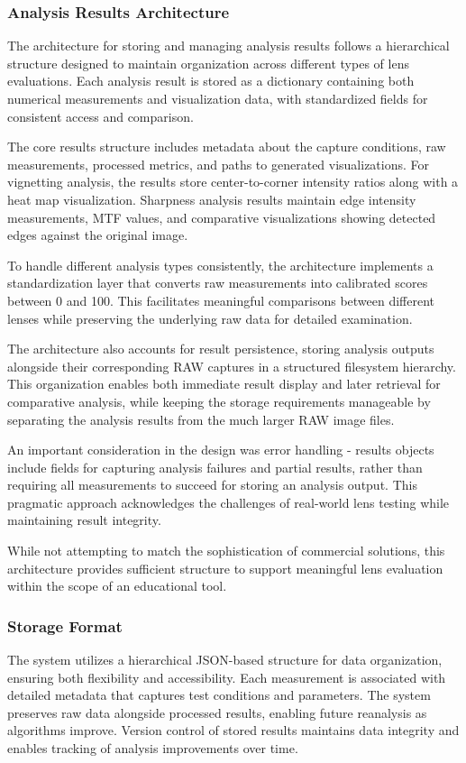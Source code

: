 \subsubsection{Analysis Results Architecture}
The architecture for storing and managing analysis results follows a hierarchical structure designed to maintain organization across different types of lens evaluations. Each analysis result is stored as a dictionary containing both numerical measurements and visualization data, with standardized fields for consistent access and comparison.

The core results structure includes metadata about the capture conditions, raw measurements, processed metrics, and paths to generated visualizations. For vignetting analysis, the results store center-to-corner intensity ratios along with a heat map visualization. Sharpness analysis results maintain edge intensity measurements, MTF values, and comparative visualizations showing detected edges against the original image.

To handle different analysis types consistently, the architecture implements a standardization layer that converts raw measurements into calibrated scores between 0 and 100. This facilitates meaningful comparisons between different lenses while preserving the underlying raw data for detailed examination.

The architecture also accounts for result persistence, storing analysis outputs alongside their corresponding RAW captures in a structured filesystem hierarchy. This organization enables both immediate result display and later retrieval for comparative analysis, while keeping the storage requirements manageable by separating the analysis results from the much larger RAW image files.

An important consideration in the design was error handling - results objects include fields for capturing analysis failures and partial results, rather than requiring all measurements to succeed for storing an analysis output. This pragmatic approach acknowledges the challenges of real-world lens testing while maintaining result integrity.

While not attempting to match the sophistication of commercial solutions, this architecture provides sufficient structure to support meaningful lens evaluation within the scope of an educational tool.

\subsubsection{Storage Format}
The system utilizes a hierarchical JSON-based structure for data organization, ensuring both flexibility and accessibility. Each measurement is associated with detailed metadata that captures test conditions and parameters. The system preserves raw data alongside processed results, enabling future reanalysis as algorithms improve. Version control of stored results maintains data integrity and enables tracking of analysis improvements over time.

